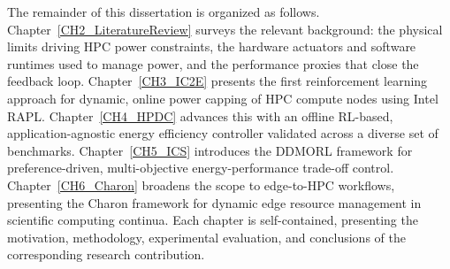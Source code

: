 The remainder of this dissertation is organized as follows.
Chapter~\ref{CH2_LiteratureReview} surveys the relevant background: the physical limits
driving HPC power constraints, the hardware actuators and software runtimes used to
manage power, and the performance proxies that close the feedback loop.
Chapter~\ref{CH3_IC2E} presents the first reinforcement learning approach for
dynamic, online power capping of HPC compute nodes using Intel RAPL.
Chapter~\ref{CH4_HPDC} advances this with an offline RL-based, application-agnostic
energy efficiency controller validated across a diverse set of benchmarks.
Chapter~\ref{CH5_ICS} introduces the DDMORL framework for preference-driven,
multi-objective energy-performance trade-off control.
Chapter~\ref{CH6_Charon} broadens the scope to edge-to-HPC workflows, presenting
the Charon framework for dynamic edge resource management in scientific computing
continua.
Each chapter is self-contained, presenting the motivation, methodology, experimental
evaluation, and conclusions of the corresponding research contribution.
